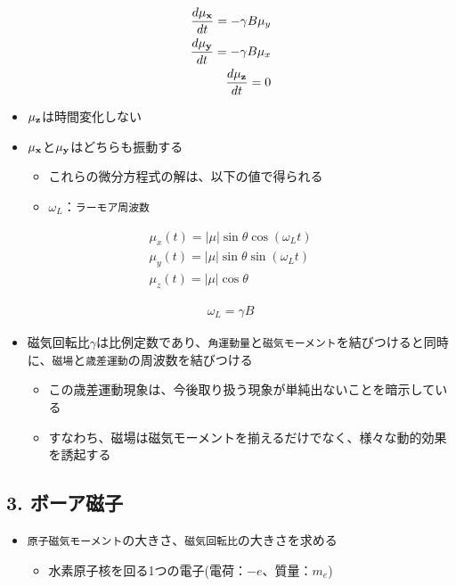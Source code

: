 \documentclass[11pt]{article}
\providecommand{\tightlist}{%
      \setlength{\itemsep}{0pt}\setlength{\parskip}{0pt}}
\begin{document}
\begin{eqnarray}
\frac{d{\bf \mu_x}}{dt} = - \gamma B\mu_y\\
\frac{d{\bf \mu_y}}{dt} = - \gamma B\mu_x\\
\frac{d{\bf \mu_z}}{dt} = 0
\end{eqnarray}

    \begin{itemize}
\item
  \({\bf \mu_z}\)は時間変化しない
\item
  \({\bf \mu_x}\)と\({\bf \mu_y}\)はどちらも振動する

  \begin{itemize}
  \item
    これらの微分方程式の解は、以下の値で得られる
  \item
    \(\omega_L\)：\texttt{ラーモア周波数}
  \end{itemize}
\end{itemize}

\begin{eqnarray}
\mu_x(t) = |\mu| \sin \theta \cos(\omega_L t)\\
\mu_y(t) = |\mu| \sin \theta \sin(\omega_L t)\\
\mu_z(t) = |\mu| \cos \theta
\end{eqnarray}

\begin{eqnarray}
\omega_L　= \gamma B
\end{eqnarray}

    \begin{itemize}
\item
  磁気回転比\(\gamma\)は比例定数であり、\texttt{角運動量}と\texttt{磁気モーメント}を結びつけると同時に、\texttt{磁場}と\texttt{歳差運動}の周波数を結びつける

  \begin{itemize}
  \item
    この歳差運動現象は、今後取り扱う現象が単純出ないことを暗示している
  \item
    すなわち、磁場は磁気モーメントを揃えるだけでなく、様々な動的効果を誘起する
  \end{itemize}
\end{itemize}

    \subsection{3. ボーア磁子}\label{ux30dcux30fcux30a2ux78c1ux5b50}

\begin{itemize}
\item
  \texttt{原子磁気モーメント}の大きさ、\texttt{磁気回転比}の大きさを求める

  \begin{itemize}
  \tightlist
  \item
    水素原子核を回る1つの電子(電荷：\(-e\)、質量：\(m_e\))
  \end{itemize}
\end{itemize}
\end{document}
